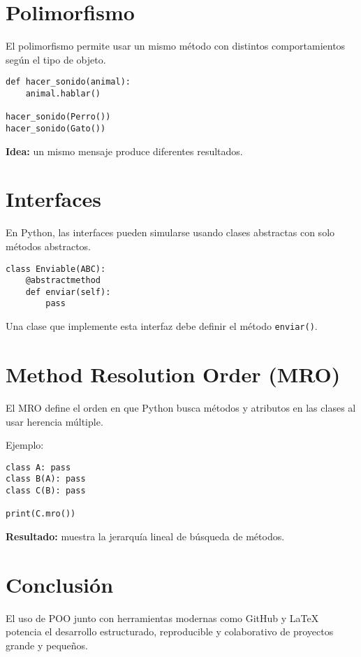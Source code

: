 \documentclass[12pt]{article}
\begin{document}
\section{Polimorfismo}
El polimorfismo permite usar un mismo método con distintos comportamientos según el tipo de objeto.  
\begin{verbatim}
def hacer_sonido(animal):
    animal.hablar()

hacer_sonido(Perro())
hacer_sonido(Gato())
\end{verbatim}

\textbf{Idea:} un mismo mensaje produce diferentes resultados.

\section{Interfaces}
En Python, las interfaces pueden simularse usando clases abstractas con solo métodos abstractos.  
\begin{verbatim}
class Enviable(ABC):
    @abstractmethod
    def enviar(self):
        pass
\end{verbatim}

Una clase que implemente esta interfaz debe definir el método \texttt{enviar()}.

\section{Method Resolution Order (MRO)}
El MRO define el orden en que Python busca métodos y atributos en las clases al usar herencia múltiple.

Ejemplo:
\begin{verbatim}
class A: pass
class B(A): pass
class C(B): pass

print(C.mro())
\end{verbatim}

\textbf{Resultado:} muestra la jerarquía lineal de búsqueda de métodos.

\section{Conclusión}
El uso de POO junto con herramientas modernas como GitHub y \LaTeX{} potencia el desarrollo estructurado, reproducible y colaborativo de proyectos grande y pequeños.
\end{document}
